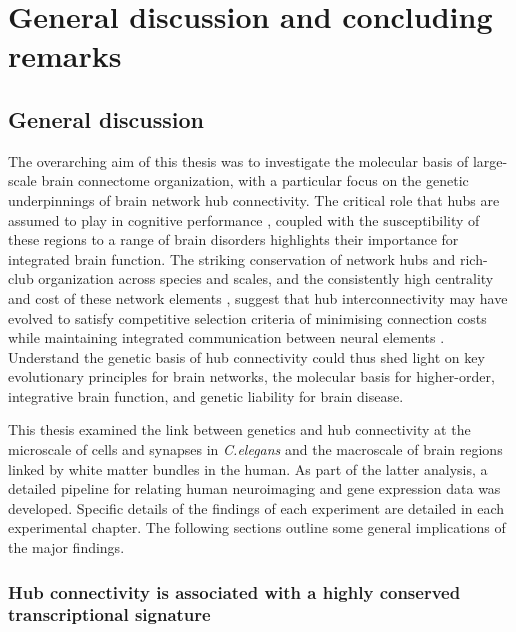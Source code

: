 \chapter{General discussion and concluding remarks}
\label{ch:Discussion}

\section{General discussion}
The overarching aim of this thesis was to investigate the molecular basis of large-scale brain connectome organization, with a particular focus on the genetic underpinnings of brain network hub connectivity. The critical role that hubs are assumed to play in cognitive performance \citep{Buckner2009,Mesulam1998}, coupled with the susceptibility of these regions to a range of brain disorders \citep{Bassett2009a,Crossley2014,Fornito2015} highlights their importance for integrated brain function. The striking conservation of network hubs and rich-club organization across species and scales, and the consistently high centrality and cost of these network elements \citep{VandenHeuvel2016}, suggest that hub interconnectivity may have evolved to satisfy competitive selection criteria of minimising connection costs while maintaining integrated communication between neural elements \citep{Bullmore2012}. Understand the genetic basis of hub connectivity could thus shed light on key evolutionary principles for brain networks, the molecular basis for higher-order, integrative brain function, and genetic liability for brain disease.

This thesis examined the link between genetics and hub connectivity at the microscale of cells and synapses in \textit{C.elegans} and the macroscale of brain regions linked by white matter bundles in the human. As part of the latter analysis, a detailed pipeline for relating human neuroimaging and gene expression data was developed. Specific details of the findings of each experiment are detailed in each experimental chapter. The following sections outline some general implications of the major findings.

\subsection*{Hub connectivity is associated with a highly conserved transcriptional signature}


